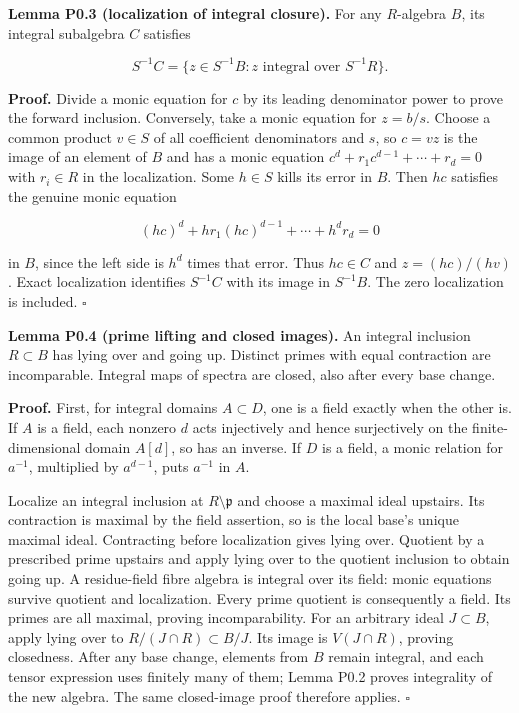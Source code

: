 \documentclass[11pt,a4paper,openany]{report}
\begin{document}
\textbf{Lemma P0.3 (localization of integral closure).} For any \(R\)-algebra \(B\), its integral subalgebra \(C\) satisfies

\[
S^{-1}C=\{z\in S^{-1}B:z\text{ integral over }S^{-1}R\}.
\]

\textbf{Proof.} Divide a monic equation for \(c\) by its leading denominator power to prove the forward inclusion. Conversely, take a monic equation for \(z=b/s\). Choose a common product \(v\in S\) of all coefficient denominators and \(s\), so \(c=vz\) is the image of an element of \(B\) and has a monic equation \(c^d+r_1c^{d-1}+\cdots+r_d=0\) with \(r_i\in R\) in the localization. Some \(h\in S\) kills its error in \(B\). Then \(hc\) satisfies the genuine monic equation

\[
(hc)^d+hr_1(hc)^{d-1}+\cdots+h^dr_d=0
\]

in \(B\), since the left side is \(h^d\) times that error. Thus \(hc\in C\) and \(z=(hc)/(hv)\). Exact localization identifies \(S^{-1}C\) with its image in \(S^{-1}B\). The zero localization is included. \(\square\)

\textbf{Lemma P0.4 (prime lifting and closed images).} An integral inclusion \(R\subset B\) has lying over and going up. Distinct primes with equal contraction are incomparable. Integral maps of spectra are closed, also after every base change.

\textbf{Proof.} First, for integral domains \(A\subset D\), one is a field exactly when the other is. If \(A\) is a field, each nonzero \(d\) acts injectively and hence surjectively on the finite-dimensional domain \(A[d]\), so has an inverse. If \(D\) is a field, a monic relation for \(a^{-1}\), multiplied by \(a^{d-1}\), puts \(a^{-1}\) in \(A\).

Localize an integral inclusion at \(R\setminus\mathfrak p\) and choose a maximal ideal upstairs. Its contraction is maximal by the field assertion, so is the local base's unique maximal ideal. Contracting before localization gives lying over. Quotient by a prescribed prime upstairs and apply lying over to the quotient inclusion to obtain going up. A residue-field fibre algebra is integral over its field: monic equations survive quotient and localization. Every prime quotient is consequently a field. Its primes are all maximal, proving incomparability. For an arbitrary ideal \(J\subset B\), apply lying over to \(R/(J\cap R)\subset B/J\). Its image is \(V(J\cap R)\), proving closedness. After any base change, elements from \(B\) remain integral, and each tensor expression uses finitely many of them; Lemma P0.2 proves integrality of the new algebra. The same closed-image proof therefore applies. \(\square\)
\end{document}
